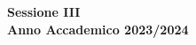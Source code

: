 \begin{titlepage}

    \vspace{1cm}

    \begin{center}
        {\large{\textbf{Sessione III\\Anno Accademico 2023/2024}}}
    \end{center}
\end{titlepage}

